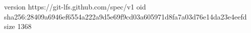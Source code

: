 version https://git-lfs.github.com/spec/v1
oid sha256:28409a6946ef6554a222a9d5e69f9cd03a605971d8fa7a03d76e14da23e4eefd
size 1368
